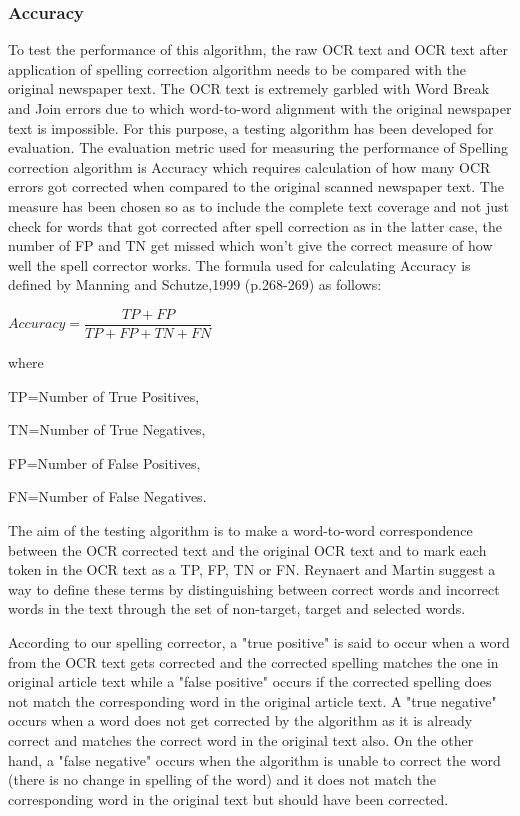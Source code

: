 \documentclass[letterpaper,11pt]{report}
\begin{document}
\subsubsection{Accuracy}

To test the performance of this algorithm, the raw OCR text and OCR text after application of spelling correction algorithm needs to be compared with the original newspaper text. The OCR text is extremely garbled with Word Break and Join errors due to which word-to-word alignment with the original newspaper text is impossible. For this purpose, a testing algorithm has been developed for evaluation. The evaluation metric used for measuring the performance of Spelling correction algorithm is Accuracy which requires calculation of how many OCR errors got corrected when compared to the original scanned newspaper text. The measure has been chosen so as to include the complete text coverage and not just check for words that got corrected after spell correction as in the latter case, the  number of FP and TN get missed which won't give the correct measure of how well the spell corrector works. The formula used for calculating Accuracy is defined by Manning and Schutze,1999 (p.268-269) as follows:

$Accuracy=  \dfrac{TP+FP} {TP+ FP + TN + FN}$


where 

TP=Number of True Positives,

TN=Number of True Negatives,

 FP=Number of False Positives,

 FN=Number of False Negatives. 

The aim of the testing algorithm is to make a word-to-word correspondence between the OCR corrected text and the original OCR text and to mark each token in the OCR text as a TP, FP, TN or FN. Reynaert and Martin\cite{reynaert2008all} suggest a way to define these terms by distinguishing between correct words and incorrect words in the text through the set of non-target, target and selected words.  

According to our spelling corrector, a "true positive" is said to occur when a word from the OCR text gets corrected and the corrected spelling matches the one in original article text while a "false positive" occurs if the corrected spelling does not match the corresponding word in the original article text. A "true negative" occurs when a word does not get corrected by the algorithm as it is already correct and matches the correct word in the original text also. On the other hand, a "false negative" occurs when the algorithm is unable to correct the word (there is no change in spelling of the word) and it does not match the corresponding word in the original text but should have been corrected.
\end{document}

